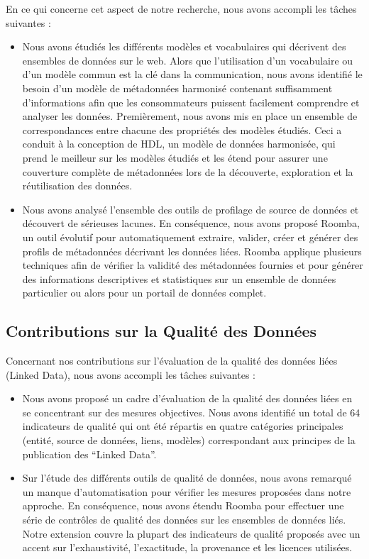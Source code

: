 En ce qui concerne cet aspect de notre recherche, nous avons accompli les tâches suivantes :
\begin{itemize}
\item Nous avons \'{e}tudi\'{e}s les diff\'{e}rents mod\`{e}les et vocabulaires qui d\'{e}crivent des ensembles de donn\'{e}es sur le web. Alors que l'utilisation d'un vocabulaire ou d'un mod\`{e}le commun est la cl\'{e} dans la communication, nous avons identifi\'{e} le besoin d'un mod\`{e}le de m\'{e}tadonn\'{e}es harmonis\'{e} contenant suffisamment d'informations afin que les consommateurs puissent facilement comprendre et analyser les donn\'{e}es. Premi\`{e}rement, nous avons mis en place un ensemble de correspondances entre chacune des propri\'{e}t\'{e}s des mod\`{e}les \'{e}tudi\'{e}s. Ceci a conduit \`{a} la conception de HDL, un mod\`{e}le de donn\'{e}es harmonis\'{e}e, qui prend le meilleur sur les mod\`{e}les \'{e}tudi\'{e}s et les \'{e}tend pour assurer une couverture compl\`{e}te de m\'{e}tadonn\'{e}es lors de la d\'{e}couverte, exploration et la r\'{e}utilisation des donn\'{e}es.
\item Nous avons analys\'{e} l'ensemble des outils de profilage de source de donn\'{e}es et d\'{e}couvert de s\'{e}rieuses lacunes. En cons\'{e}quence, nous avons propos\'{e} Roomba, un outil \'{e}volutif pour automatiquement extraire, valider, cr\'{e}er et g\'{e}n\'{e}rer des profils de m\'{e}tadonn\'{e}es d\'{e}crivant les donn\'{e}es li\'{e}es. Roomba applique plusieurs techniques afin de v\'{e}rifier la validit\'{e} des m\'{e}tadonn\'{e}es fournies et pour g\'{e}n\'{e}rer des informations descriptives et statistiques sur un ensemble de donn\'{e}es particulier ou alors pour un portail de donn\'{e}es complet.
\end{itemize}

\subsection{Contributions sur la Qualit\'{e} des Donn\'{e}es}
Concernant nos contributions sur l'\'{e}valuation de la qualit\'{e} des donn\'{e}es li\'{e}es (Linked Data), nous avons accompli les tâches suivantes :
\begin{itemize}
\item Nous avons propos\'{e} un cadre d'\'{e}valuation de la qualit\'{e} des donn\'{e}es li\'{e}es en se concentrant sur des mesures objectives. Nous avons identifi\'{e} un total de 64 indicateurs de qualit\'{e} qui ont \'{e}t\'{e} r\'{e}partis en quatre cat\'{e}gories principales (entit\'{e}, source de donn\'{e}es, liens, mod\`{e}les) correspondant aux principes de la publication des ``Linked Data''.
\item Sur l'\'{e}tude des diff\'{e}rents outils de qualit\'{e} de donn\'{e}es, nous avons remarqu\'{e} un manque d'automatisation pour v\'{e}rifier les mesures propos\'{e}es dans notre approche. En cons\'{e}quence, nous avons \'{e}tendu Roomba pour effectuer une s\'{e}rie de contr\^{o}les de qualit\'{e} des donn\'{e}es sur les ensembles de donn\'{e}es li\'{e}s. Notre extension couvre la plupart des indicateurs de qualit\'{e} propos\'{e}s avec un accent sur l'exhaustivit\'{e}, l'exactitude, la provenance et les licences utilis\'{e}es.
\end{itemize}

